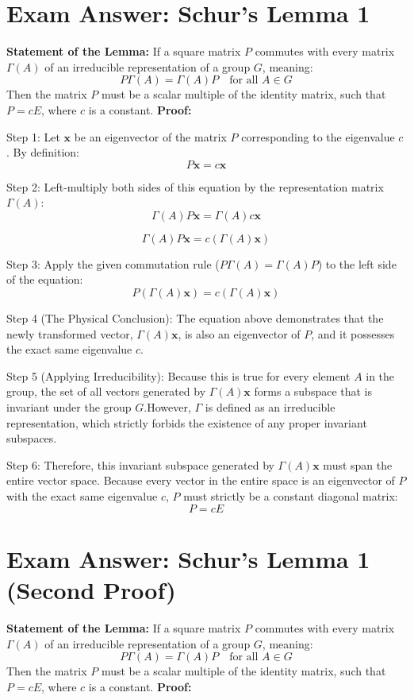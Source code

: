 \documentclass[11pt, a4paper]{report}
\begin{document}
\newpage
\newpage
\newpage
\newpage
\newpage
\newpage
\newpage

\chapter*{Exam Answer: Schur's Lemma 1}
\textbf{Statement of the Lemma:}
If a square matrix $P$ commutes with every matrix $\Gamma(A)$ of an irreducible representation of a group $G$, meaning:
\[
P \Gamma(A) = \Gamma(A) P \quad \text{for all } A \in G
\]
Then the matrix $P$ must be a scalar multiple of the identity matrix, such that $P = cE$, where $c$ is a constant.
\textbf{Proof:}

Step 1:
 Let $\mathbf{x}$ be an eigenvector of the matrix $P$ corresponding to the eigenvalue $c$. By definition:
\[
P \mathbf{x} = c \mathbf{x}
\]

Step 2:
 Left-multiply both sides of this equation by the representation matrix $\Gamma(A)$:
\[
\Gamma(A) P \mathbf{x} = \Gamma(A) c \mathbf{x}
\]

\[
\Gamma(A) P \mathbf{x} = c (\Gamma(A) \mathbf{x})
\]

Step 3:
 Apply the given commutation rule ($P \Gamma(A) = \Gamma(A) P$) to the left side of the equation:
\[
P (\Gamma(A) \mathbf{x}) = c (\Gamma(A) \mathbf{x})
\]

Step 4 (The Physical Conclusion):
 The equation above demonstrates that the newly transformed vector, $\Gamma(A)\mathbf{x}$, is also an eigenvector of $P$, and it possesses the exact same eigenvalue $c$.


 Step 5 (Applying Irreducibility):
Because this is true for every element $A$ in the group, the set of all vectors generated by $\Gamma(A)\mathbf{x}$ forms a subspace that is invariant under the group $G$.However, $\Gamma$ is defined as an irreducible representation, which strictly forbids the existence of any proper invariant subspaces.


Step 6:
Therefore, this invariant subspace generated by $\Gamma(A)\mathbf{x}$ must span the entire vector space. Because every vector in the entire space is an eigenvector of $P$ with the exact same eigenvalue $c$, $P$ must strictly be a constant diagonal matrix:
\[
P = cE
\]
\newpage

\chapter*{Exam Answer: Schur's Lemma 1 (Second Proof)}
\textbf{Statement of the Lemma:}
If a square matrix $P$ commutes with every matrix $\Gamma(A)$ of an irreducible representation of a group $G$, meaning:
\[
P \Gamma(A) = \Gamma(A) P \quad \text{for all } A \in G
\]
Then the matrix $P$ must be a scalar multiple of the identity matrix, such that $P = cE$, where $c$ is a constant.
\textbf{Proof:}
\end{document}
